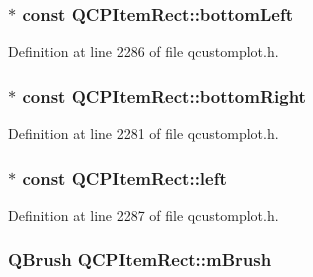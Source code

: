 \hypertarget{class_q_c_p_item_rect_abd8ee63fdf81f0c74bf7ccadee8603da}{
\subsubsection[{bottom\-Left}]{$\ast$ const Q\-C\-P\-Item\-Rect\-::bottom\-Left}}\label{class_q_c_p_item_rect_abd8ee63fdf81f0c74bf7ccadee8603da}


Definition at line 2286 of file qcustomplot.\-h.

\hypertarget{class_q_c_p_item_rect_a409f3bfe615a7e322bb3d4d193d85b26}{
\subsubsection[{bottom\-Right}]{$\ast$ const Q\-C\-P\-Item\-Rect\-::bottom\-Right}}\label{class_q_c_p_item_rect_a409f3bfe615a7e322bb3d4d193d85b26}


Definition at line 2281 of file qcustomplot.\-h.

\hypertarget{class_q_c_p_item_rect_aad0ca1af0c8debfc20d7b47fc942764d}{
\subsubsection[{left}]{$\ast$ const Q\-C\-P\-Item\-Rect\-::left}}\label{class_q_c_p_item_rect_aad0ca1af0c8debfc20d7b47fc942764d}


Definition at line 2287 of file qcustomplot.\-h.

\hypertarget{class_q_c_p_item_rect_a2d7f207fada27588b3a52b19234d3c2e}{
\subsubsection[{m\-Brush}]{\setlength{\rightskip}{0pt plus 5cm}Q\-Brush Q\-C\-P\-Item\-Rect\-::m\-Brush\hspace{0.3cm}{\ttfamily [protected]}}}\label{class_q_c_p_item_rect_a2d7f207fada27588b3a52b19234d3c2e}


